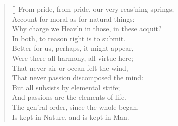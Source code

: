 \begin{verse}[\versewidth]
From pride, from pride, our very reas'ning springs;\\
Account for moral as for natural things:\\
Why charge we Heav'n in those, in these acquit?\\
In both, to reason right is to submit.\\
\vin Better for us, perhaps, it might appear,\\
Were there all harmony, all virtue here;\\
That never air or ocean felt the wind,\\
That never passion discomposed the mind:\\
But all subsists by elemental strife;\\
And passions are the elements of life.\\
The gen'ral order, since the whole began,\\
Is kept in Nature, and is kept in Man.


\end{verse}
